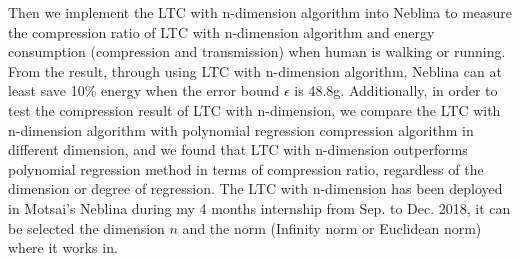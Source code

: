 Then we implement the LTC with n-dimension algorithm into Neblina to measure the
compression ratio of LTC with n-dimension algorithm and energy consumption
(compression and transmission) when human is walking or running. From the
result, through using LTC with n-dimension algorithm, Neblina can at least save 10\%
energy when the error bound $\epsilon$ is 48.8g. Additionally, in order to test
the compression result of LTC with n-dimension, we compare the LTC with n-dimension
algorithm with polynomial regression compression algorithm in different
dimension, and we found that LTC with n-dimension outperforms polynomial regression
method in terms of compression ratio, regardless of the dimension or degree of
regression.
The LTC with n-dimension has been deployed in Motsai's Neblina during my 4 months internship from Sep. to Dec. 2018, it can be selected the dimension $n$ and the norm (Infinity norm or Euclidean norm) where it works in.


% 
% 






